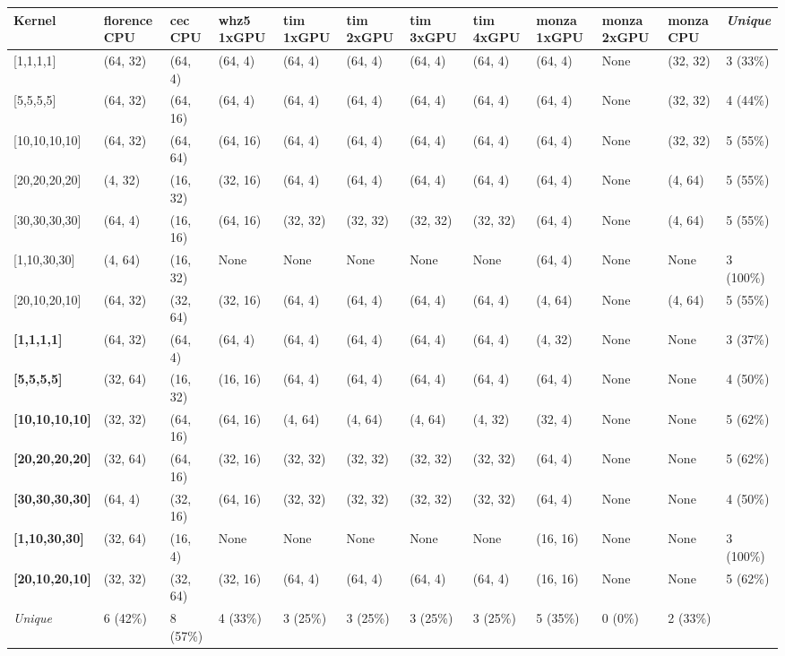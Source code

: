 \begin{tabular}{|p{1.8cm} | p{1cm} | p{1cm} | p{1cm} | p{1cm} | p{1cm} | p{1cm} | p{1cm} | p{1cm} | p{1cm} | p{1cm} | p{1.1cm}|}
\hline
\textbf{Kernel} & \textbf{florence CPU} & \textbf{cec CPU} & \textbf{whz5 1xGPU} & \textbf{tim 1xGPU} & \textbf{tim 2xGPU} & \textbf{tim 3xGPU} & \textbf{tim 4xGPU} & \textbf{monza 1xGPU} & \textbf{monza 2xGPU} & \textbf{monza CPU} & \textit{Unique}\\
\hline
{[}1,1,1,1{]} & (64, 32) & (64, 4) & (64, 4) & (64, 4) & (64, 4) & (64, 4) & (64, 4) & (64, 4) & None & (32, 32) & 3 (33\%)\\
{[}5,5,5,5{]} & (64, 32) & (64, 16) & (64, 4) & (64, 4) & (64, 4) & (64, 4) & (64, 4) & (64, 4) & None & (32, 32) & 4 (44\%)\\
{[}10,10,10,10{]} & (64, 32) & (64, 64) & (64, 16) & (64, 4) & (64, 4) & (64, 4) & (64, 4) & (64, 4) & None & (32, 32) & 5 (55\%)\\
{[}20,20,20,20{]} & (4, 32) & (16, 32) & (32, 16) & (64, 4) & (64, 4) & (64, 4) & (64, 4) & (64, 4) & None & (4, 64) & 5 (55\%)\\
{[}30,30,30,30{]} & (64, 4) & (16, 16) & (64, 16) & (32, 32) & (32, 32) & (32, 32) & (32, 32) & (64, 4) & None & (4, 64) & 5 (55\%)\\
{[}1,10,30,30{]} & (4, 64) & (16, 32) & None & None & None & None & None & (64, 4) & None & None & 3 (100\%)\\
{[}20,10,20,10{]} & (64, 32) & (32, 64) & (32, 16) & (64, 4) & (64, 4) & (64, 4) & (64, 4) & (4, 64) & None & (4, 64) & 5 (55\%)\\
\textbf{{[}1,1,1,1{]}} & (64, 32) & (64, 4) & (64, 4) & (64, 4) & (64, 4) & (64, 4) & (64, 4) & (4, 32) & None & None & 3 (37\%)\\
\textbf{{[}5,5,5,5{]}} & (32, 64) & (16, 32) & (16, 16) & (64, 4) & (64, 4) & (64, 4) & (64, 4) & (64, 4) & None & None & 4 (50\%)\\
\textbf{{[}10,10,10,10{]}} & (32, 32) & (64, 16) & (64, 16) & (4, 64) & (4, 64) & (4, 64) & (4, 32) & (32, 4) & None & None & 5 (62\%)\\
\textbf{{[}20,20,20,20{]}} & (32, 64) & (64, 16) & (32, 16) & (32, 32) & (32, 32) & (32, 32) & (32, 32) & (64, 4) & None & None & 5 (62\%)\\
\textbf{{[}30,30,30,30{]}} & (64, 4) & (32, 16) & (64, 16) & (32, 32) & (32, 32) & (32, 32) & (32, 32) & (64, 4) & None & None & 4 (50\%)\\
\textbf{{[}1,10,30,30{]}} & (32, 64) & (16, 4) & None & None & None & None & None & (16, 16) & None & None & 3 (100\%)\\
\textbf{{[}20,10,20,10{]}} & (32, 32) & (32, 64) & (32, 16) & (64, 4) & (64, 4) & (64, 4) & (64, 4) & (16, 16) & None & None & 5 (62\%)\\
\hline
\textit{Unique} & 6 (42\%) & 8 (57\%) & 4 (33\%) & 3 (25\%) & 3 (25\%) & 3 (25\%) & 3 (25\%) & 5 (35\%) & 0 (0\%) & 2 (33\%) & \\
\hline
\end{tabular}
